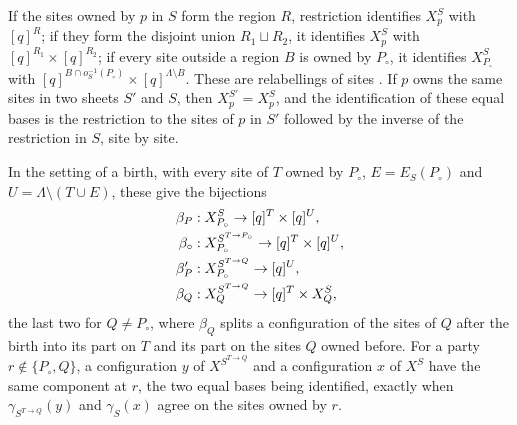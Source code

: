 \begin{definition}
    \label{def:party_sheet_region_coords}
    \leanok
    If the sites owned by $p$ in $S$ form the region $R$, restriction identifies $X^S_p$ with
    $[q]^R$; if they form the disjoint union $R_1\sqcup R_2$, it identifies $X^S_p$ with
    $[q]^{R_1}\times[q]^{R_2}$; if every site outside a region $B$ is owned by $P_\circ$, it
    identifies $X^S_{P_\circ}$ with $[q]^{B\cap o_S^{-1}(P_\circ)}\times[q]^{\Lambda\setminus B}$.
    These are relabellings of sites \cite[Section~6]{OpenAI2026PolynomialPEPS}. If $p$ owns the
    same sites in two sheets $S'$ and $S$, then $X^{S'}_p=X^S_p$, and the identification of these
    equal bases is the restriction to the sites of $p$ in $S'$ followed by the inverse of the
    restriction in $S$, site by site.

    In the setting of a birth, with every site of $T$ owned by $P_\circ$, $E=E_S(P_\circ)$ and
    $U=\Lambda\setminus(T\cup E)$, these give the bijections
    \begin{align}
        \beta_P     & : X^S_{P_\circ}\to[q]^T\times[q]^U,                    \notag \\
        \beta_\circ & : X^{S^{T\to P_\circ}}_{P_\circ}\to[q]^T\times[q]^U, \notag   \\
        \beta'_P    & : X^{S^{T\to Q}}_{P_\circ}\to[q]^U,                  \notag   \\
        \beta_Q     & : X^{S^{T\to Q}}_{Q}\to[q]^T\times X^S_Q,
        \label{eq:party_birth_bases}
    \end{align}
    the last two for $Q\neq P_\circ$, where $\beta_Q$ splits a configuration of the sites of $Q$
    after the birth into its part on $T$ and its part on the sites $Q$ owned before. For a party
    $r\notin\{P_\circ,Q\}$, a configuration $y$ of $X^{S^{T\to Q}}$ and a configuration $x$ of
    $X^S$ have the same component at $r$, the two equal bases being identified, exactly when
    $\gamma_{S^{T\to Q}}(y)$ and $\gamma_S(x)$ agree on the sites owned by $r$.
\end{definition}

